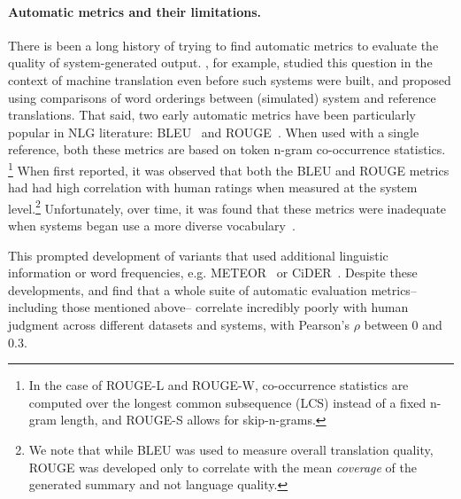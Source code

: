 \paragraph{Automatic metrics and their limitations.} 
There is been a long history of trying to find automatic metrics to evaluate the quality of system-generated output.
\citet{miller1956psychological}, for example, studied this question in the context of machine translation even before such systems were built, and proposed using comparisons of word orderings between (simulated) system and reference translations.
That said, two early automatic metrics have been particularly popular in NLG literature: BLEU~\citep{papineni02bleu} and ROUGE~\citep{lin2004rouge}.
When used with a single reference, both these metrics are based on token n-gram co-occurrence statistics.
\footnote{In the case of ROUGE-L and ROUGE-W, co-occurrence statistics are computed over the longest common subsequence (LCS) instead of a fixed n-gram length, and ROUGE-S allows for skip-n-grams.}
When first reported, it was observed that both the BLEU and ROUGE metrics had had high correlation with human ratings when measured at the system level.\footnote{%
We note that while BLEU was used to measure overall translation quality, ROUGE was developed only to correlate with the mean \textit{coverage} of the generated summary and not language quality.
}
Unfortunately, over time, it was found that these metrics were inadequate when systems began use a more diverse vocabulary~\cite{lavie2009meteor,cohan2016revisiting}.

This prompted development of variants that used additional linguistic information or word frequencies, e.g. METEOR~\citep{lavie2009meteor,denkowski2014meteor} or CiDER~\citep{vedantam2015cider}.
Despite these developments, \citet{liu2016evaluate} and \citet{novikova2017why} find that a whole suite of automatic evaluation metrics-- including those mentioned above-- correlate incredibly poorly with human judgment across different datasets and systems, with Pearson's $\rho$ between $0$ and $0.3$.



